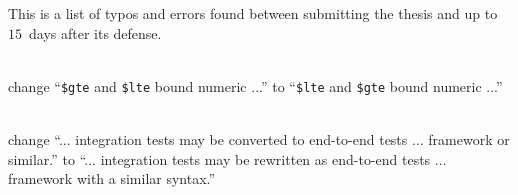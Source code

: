 \documentclass{myabstract}
\begin{document}
This is a list of typos and errors found between submitting the thesis and up to $15$~days after its defense.

\begin{description}[font=\normalfont]
\item[Page $63$, Section 4.4.2] \phantom{} \\ change ``\texttt{\$gte} and \texttt{\$lte} bound numeric ...'' to ``\texttt{\$lte} and \texttt{\$gte} bound numeric ...''
\item[Page $65$, Section 5.1] \phantom{} \\ change ``... integration tests may be converted to end-to-end tests ... framework or similar.'' to ``... integration tests may be rewritten as end-to-end tests ... framework with a similar syntax.''
\end{description}
\end{document}
